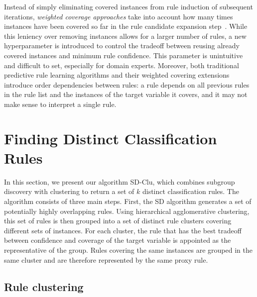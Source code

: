 \documentclass[
  oneside]{book}
\begin{document}
Instead of simply eliminating covered instances from rule induction of subsequent iterations, \emph{weighted coverage approaches} take into account how many times instances have been covered so far in the rule candidate expansion step~\autocite{Lavravc:CN2-SD04}.
While this leniency over removing instances allows for a larger number of rules, a new hyperparameter is introduced to control the tradeoff between reusing already covered instances and minimum rule confidence.
This parameter is unintuitive and difficult to set, especially for domain experts.
Moreover, both traditional predictive rule learning algorithms and their weighted covering extensions introduce order dependencies between rules: a rule depends on all previous rules in the rule list and the instances of the target variable it covers, and it may not make sense to interpret a single rule.

\hypertarget{sdclu-method}{%
\section{Finding Distinct Classification Rules}\label{sdclu-method}}

In this section, we present our algorithm SD-Clu, which combines subgroup discovery with clustering to return a set of \(k\) distinct classification rules.
The algorithm consists of three main steps.
First, the SD algorithm generates a set of potentially highly overlapping rules.
Using hierarchical agglomerative clustering, this set of rules is then grouped into a set of distinct rule clusters covering different sets of instances.
For each cluster, the rule that has the best tradeoff between confidence and coverage of the target variable is appointed as the representative of the group.
Rules covering the same instances are grouped in the same cluster and are therefore represented by the same proxy rule.

\hypertarget{rule-clustering}{%
\subsection{Rule clustering}\label{rule-clustering}}
\end{document}

